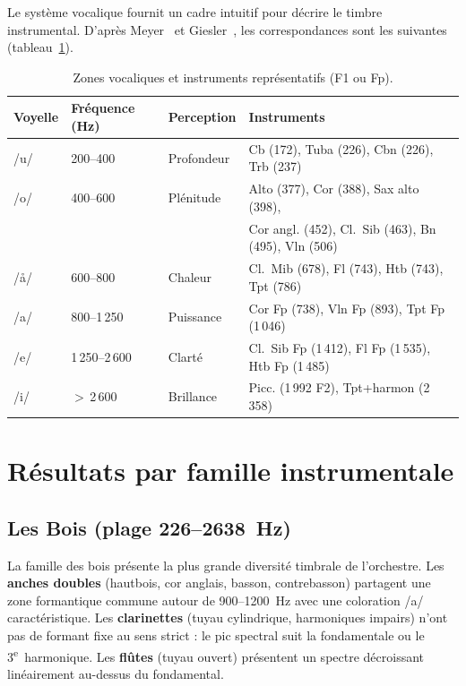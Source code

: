 \documentclass[11pt,a4paper]{article}
\begin{document}
Le système vocalique fournit un cadre intuitif pour décrire le timbre
instrumental. D'après Meyer~\cite{meyer2009} et
Giesler~\cite{giesler1985}, les correspondances sont les suivantes
(tableau~\ref{tab:voyelles}).

\begin{table}[ht]
\centering
\caption{Zones vocaliques et instruments représentatifs (F1 ou Fp).}
\label{tab:voyelles}
\begin{tabular}{llll}
\toprule
Voyelle & Fréquence (Hz) & Perception & Instruments \\
\midrule
/u/ & 200--400 & Profondeur & Cb (172), Tuba (226), Cbn (226), Trb (237) \\
/o/ & 400--600 & Plénitude  & Alto (377), Cor (388), Sax alto (398), \\
    &          &            & Cor angl. (452), Cl.~Sib (463), Bn (495), Vln (506) \\
/\r{a}/ & 600--800 & Chaleur & Cl.~Mib (678), Fl (743), Htb (743), Tpt (786) \\
/a/ & 800--1\,250 & Puissance & Cor Fp (738), Vln Fp (893), Tpt Fp (1\,046) \\
/e/ & 1\,250--2\,600 & Clarté & Cl.~Sib Fp (1\,412), Fl Fp (1\,535), Htb Fp (1\,485) \\
/i/ & $>$\,2\,600 & Brillance & Picc. (1\,992 F2), Tpt+harmon (2\,358) \\
\bottomrule
\end{tabular}
\end{table}


\section{Résultats par famille instrumentale}

\subsection{Les Bois (plage 226--\SI{2638}{Hz})}

La famille des bois présente la plus grande diversité timbrale de
l'orchestre. Les \textbf{anches doubles} (hautbois, cor anglais, basson,
contrebasson) partagent une zone formantique commune autour de
900--\SI{1200}{Hz} avec une coloration /a/ caractéristique. Les
\textbf{clarinettes} (tuyau cylindrique, harmoniques impairs) n'ont pas
de formant fixe au sens strict : le pic spectral suit la fondamentale ou
le 3\textsuperscript{e}~harmonique. Les \textbf{flûtes} (tuyau ouvert)
présentent un spectre décroissant linéairement au-dessus du fondamental.
\end{document}
